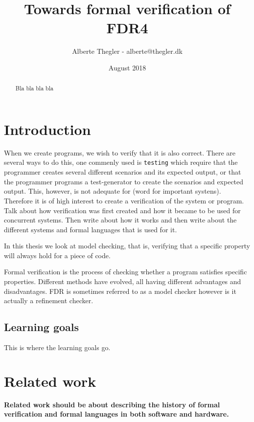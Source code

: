 \documentclass[a4paper]{report}
\title{Towards formal verification of FDR4}
\author{Alberte Thegler - alberte@thegler.dk}
\date{August 2018}
\begin{document}
\maketitle

\begin{abstract}
\begin{doublespace}
Bla bla 
bla bla


\end{doublespace}
\end{abstract}



\newpage
\tableofcontents

\newpage
\listoftodos
\newpage
{}
\chapter{Introduction}
When we create programs, we wish to verify that it is also correct. There are several ways to do this, one commenly used is \texttt{testing} which require that the programmer creates several different scenarios and its expected output, or that the programmer programs a test-generator to create the scenarios and expected output. This, however, is not adequate for (word for important systens). Therefore it is of high interest to create a verification of the system or program.\\
Talk about how verification was first created and how it became to be used for concurrent systems. Then write about how it works and then write about the different systems and formal languages that is used for it. 


In this thesis we look at model checking, that is, verifying that a specific property will always hold for a piece of code.


Formal verification is the process of checking whether a program satisfies specific properties. Different methods have evolved, all having different advantages and disadvantages. FDR is sometimes referred to as a model checker however is it actually a refinement checker. 
\section{Learning goals}
This is where the learning goals go.
\chapter{Related work}
\textbf{Related work should be about describing the history of formal verification and formal languages in both software and hardware.}
\end{document}
